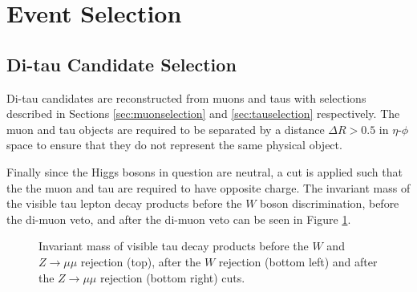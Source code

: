 \section{Event Selection}
\label{sec:eventselection}

\subsection{Di-tau Candidate Selection}
\label{sec:ditauselection}
Di-tau candidates are reconstructed from muons and taus with selections described in Sections \ref{sec:muonselection} and \ref{sec:tauselection} respectively.
The muon and tau objects are required to be separated by a distance $\Delta R > 0.5$ in $\eta$-$\phi$ space to ensure that they do not represent the same physical object.





Finally since the Higgs bosons in question are neutral, a cut is applied such that the the muon and tau are required to have opposite charge.
The invariant mass of the visible tau lepton decay products before the $W$ boson discrimination, before the di-muon veto, and after the di-muon veto can be seen in Figure \ref{fig:mvisible}.
\begin{figure}[ht]
\centering
{}


\caption{Invariant mass of visible tau decay products before the $W$ and $Z\rightarrow\mu\mu$ rejection (top), after the $W$ rejection (bottom left) and after the $Z\rightarrow\mu\mu$ rejection (bottom right) cuts.}
\label{fig:mvisible}
\end{figure}


